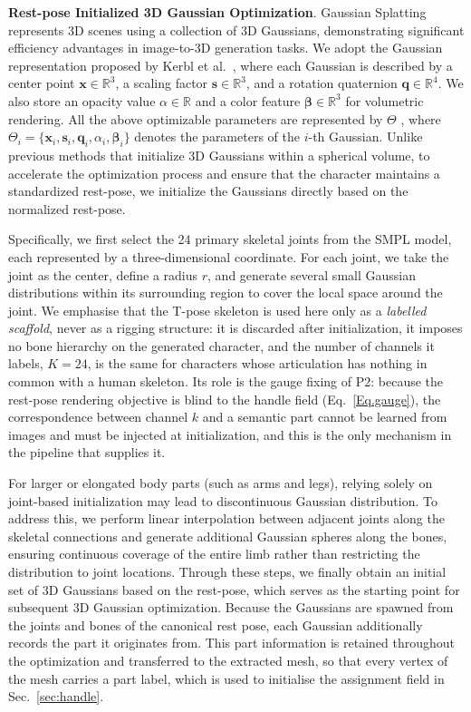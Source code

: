 \documentclass[lettersize,journal]{IEEEtran}
\newcommand{\blu}[1]{\texorpdfstring{{\leavevmode\color{blue}#1}}{#1}}
\begin{document}
\textbf{Rest-pose Initialized 3D Gaussian \blu{Optimization}}.  Gaussian Splatting represents 3D scenes using a collection of 3D Gaussians, demonstrating significant efficiency advantages in image-to-3D generation tasks. We adopt the Gaussian representation proposed by Kerbl et al.~\cite{kerbl20233d}, where each Gaussian is described by a center point $\mathbf{x}\in \mathbb{R}^3$, a scaling factor $\mathbf{s}\in \mathbb{R}^3$, and a rotation quaternion $\mathbf{q}\in \mathbb{R}^4$. We also store an opacity value $\alpha \in \mathbb{R}$ and a color feature $\bm{\beta} \in \mathbb{R}^3$ for volumetric rendering. All the above optimizable parameters are represented by $\Theta$  , where $\Theta_i = \{\mathbf{x}_i, \mathbf{s}_i, \mathbf{q}_i, \alpha_i, \bm{\beta}_i\}$ denotes the parameters of the $i$-th Gaussian. Unlike previous methods that initialize 3D Gaussians within a spherical volume, to accelerate the optimization process and ensure that the character maintains a standardized rest-pose, we initialize the Gaussians directly based on the normalized rest-pose.

Specifically, we first select the 24 primary skeletal joints from the SMPL model, each represented by a three-dimensional coordinate. For each joint, we take the joint as the center, define a radius $r$, and generate several small Gaussian distributions within its surrounding region to cover the local space around the joint. We emphasise that the T-pose skeleton is used here only as a \textit{labelled scaffold}, never as a rigging structure: it is discarded after initialization, it imposes no bone hierarchy on the generated character, and the number of channels it labels, $K=24$, is the same for characters whose articulation has nothing in common with a human skeleton. Its role is the gauge fixing of P2: because the rest-pose rendering objective is blind to the handle field (Eq.~\ref{Eq.gauge}), the correspondence between channel $k$ and a semantic part cannot be learned from images and must be injected at initialization, and this is the only mechanism in the pipeline that supplies it.

For larger or elongated body parts (such as arms and legs), relying solely on joint-based initialization may lead to discontinuous Gaussian distribution. To address this, we perform linear interpolation between adjacent joints along the skeletal connections and generate additional Gaussian spheres along the bones, ensuring continuous coverage of the entire limb rather than restricting the distribution to joint locations. Through these steps, we finally obtain an initial set of 3D Gaussians based on the rest-pose, which serves as the starting point for subsequent 3D Gaussian optimization. \blu{Because the Gaussians are spawned from the joints and bones of the canonical rest pose,
each Gaussian additionally records the part it originates from. This part information is
retained throughout the optimization and transferred to the extracted mesh, so that every
vertex of the mesh carries a part label, which is used to initialise the} assignment field in
Sec.~\ref{sec:handle}.
\end{document}
